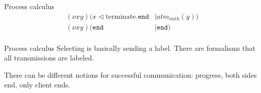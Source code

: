 \begin{frame}{Process calculus}
\begin{align*}
    (\nu xy)(x\triangleleft \text{terminate}.\texttt{end}                                               & | atm_{auth}(y))                                                                                                                         \\
    (\nu xy)(\texttt{end}                                                                               & | \texttt{end})                                                                                                                          \\
  \end{align*}
\end{frame}

\begin{frame}{Process calculus}
  Selecting is basically sending a label. There are formalisms that all transmissions are labeled.

  There can be different notions for successful communication: progress, both sides end, only client ends.
\end{frame}